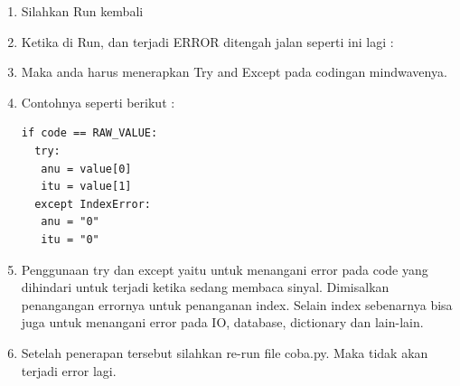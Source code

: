 \begin{enumerate}
\item Silahkan Run kembali
\item Ketika di Run, dan terjadi ERROR ditengah jalan seperti ini lagi :
\item Maka anda harus menerapkan Try and Except pada codingan mindwavenya.
\item Contohnya seperti berikut :
\begin{verbatim}
if code == RAW_VALUE:
  try:
   anu = value[0]
   itu = value[1]
  except IndexError:
   anu = "0"
   itu = "0"
\end{verbatim}
\item Penggunaan try dan except yaitu untuk menangani error pada code yang dihindari untuk terjadi ketika sedang membaca sinyal. Dimisalkan penangangan errornya untuk penanganan index. Selain index sebenarnya bisa juga untuk menangani error pada IO, database, dictionary dan lain-lain.
\item Setelah penerapan tersebut silahkan re-run file coba.py. Maka tidak akan terjadi error lagi.
\end{enumerate}

